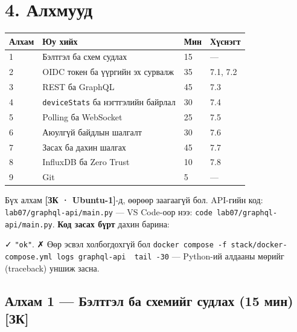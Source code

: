 \hypertarget{ux430ux43bux445ux43cux443ux443ux434}{%
\section{4. Алхмууд}\label{ux430ux43bux445ux43cux443ux443ux434}}

\begingroup\scriptsize\begin{longtable}[]{@{}llll@{}}
\toprule
Алхам & Юу хийх & Мин & Хүснэгт\tabularnewline
\midrule
\endhead
1 & Бэлтгэл ба схем судлах & 15 & ---\tabularnewline
2 & OIDC токен ба үүргийн эх сурвалж & 35 & 7.1, 7.2\tabularnewline
3 & REST ба GraphQL & 45 & 7.3\tabularnewline
4 & \texttt{deviceStats} ба нэгтгэлийн байрлал & 30 & 7.4\tabularnewline
5 & Polling ба WebSocket & 25 & 7.5\tabularnewline
6 & Аюулгүй байдлын шалгалт & 30 & 7.6\tabularnewline
7 & Засах ба дахин шалгах & 45 & 7.7\tabularnewline
8 & InfluxDB ба Zero Trust & 10 & 7.8\tabularnewline
9 & Git & 5 & ---\tabularnewline
\bottomrule
\end{longtable}\endgroup

Бүх алхам \textbf{{[}ЗК · Ubuntu-1{]}}-д, өөрөөр заагаагүй бол. API-гийн код: \texttt{lab07/\allowbreak{}graphql-api/\allowbreak{}main.\allowbreak{}py} --- VS Code-оор нээ: \texttt{code\ lab07/\allowbreak{}graphql-api/\allowbreak{}main.\allowbreak{}py}. \textbf{Код засах бүрт} дахин барина:

\begin{Shaded}
\begin{Highlighting}[]
\KeywordTok{\&\&} \KeywordTok{\&\&} 
\KeywordTok{;} \KeywordTok{|} 
\end{Highlighting}
\end{Shaded}

✓ \texttt{"ok"}. ✗ Өөр эсвэл холбогдохгүй бол \texttt{docker\ compose\ -f\ stack/docker-compose.yml\ logs\ graphql-api\ \textbar{}\ tail\ -30} --- Python-ий алдааны мөрийг (traceback) уншиж засна.

\hypertarget{ux430ux43bux445ux430ux43c-1-ux431ux44dux43bux442ux433ux44dux43b-ux431ux430-ux441ux445ux435ux43cux438ux439ux433-ux441ux443ux434ux43bux430ux445-15-ux43cux438ux43d-ux437ux43a}{%
\subsection{Алхам 1 --- Бэлтгэл ба схемийг судлах (15 мин) {[}ЗК{]}}\label{ux430ux43bux445ux430ux43c-1-ux431ux44dux43bux442ux433ux44dux43b-ux431ux430-ux441ux445ux435ux43cux438ux439ux433-ux441ux443ux434ux43bux430ux445-15-ux43cux438ux43d-ux437ux43a}}

